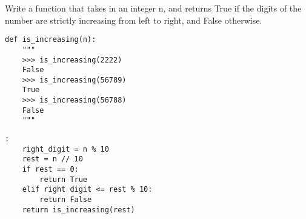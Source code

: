 \begin{blocksection}
\question Write a function that takes in an integer n, and returns True if the digits of the number are strictly increasing from left to right, and False otherwise.

\begin{lstlisting}
def is_increasing(n):
    """
    >>> is_increasing(2222)
    False
    >>> is_increasing(56789)
    True
    >>> is_increasing(56788)
    False
    """
\end{lstlisting}

\begin{solution}[1in]
\begin{lstlisting}:
    right_digit = n % 10
    rest = n // 10
    if rest == 0:
        return True
    elif right digit <= rest % 10:
        return False
    return is_increasing(rest)
\end{lstlisting}
\end{solution}
\end{blocksection}
